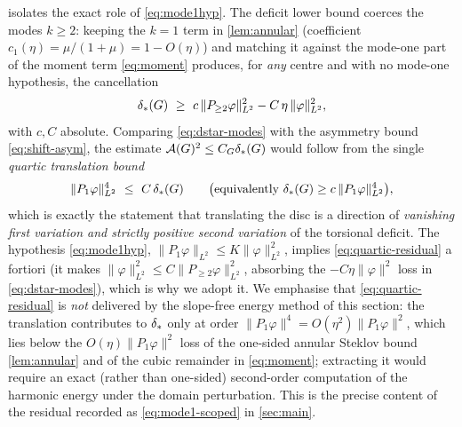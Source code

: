 \begin{remark}
\label{rem:mode1-residual}
 isolates the exact role of \eqref{eq:mode1hyp}. The
deficit lower bound coerces the modes $k\ge2$: keeping the $k=1$ term in
\cref{lem:annular} (coefficient $c_1(\eta)=\mu/(1+\mu)=1-O(\eta)$) and matching
it against the mode-one part of the moment term \eqref{eq:moment} produces, for
\emph{any} centre and with no mode-one hypothesis, the cancellation
\begin{equation}\label{eq:dstar-modes}
   \dstar(G)\ \ge\ c\,\|P_{\ge2}\varphi\|_{L^2}^2-C\,\eta\,\|\varphi\|_{L^2}^2 ,
\end{equation}
with $c,C$ absolute. Comparing \eqref{eq:dstar-modes} with the asymmetry bound
\eqref{eq:shift-asym}, the estimate $\mathcal{A}(G)^2\le C_G\delta_{*}(G)$ would follow from
the single \emph{quartic translation bound}
\begin{equation}\label{eq:quartic-residual}
   \|P_1\varphi\|_{L^2}^4\ \le\ C\,\delta_{*}(G)
   \qquad\bigl(\text{equivalently }\delta_{*}(G)\ge c\,\|P_1\varphi\|_{L^2}^4\bigr),
\end{equation}
which is exactly the statement that translating the disc is a direction of
\emph{vanishing first variation and strictly positive second variation} of the
torsional deficit. The hypothesis \eqref{eq:mode1hyp}, $\|P_1\varphi\|_{L^2}\le
K\|\varphi\|_{L^2}^2$, implies \eqref{eq:quartic-residual} a fortiori (it makes
$\|\varphi\|_{L^2}^2\le C\|P_{\ge2}\varphi\|_{L^2}^2$, absorbing the
$-C\eta\|\varphi\|^2$ loss in \eqref{eq:dstar-modes}), which is why we adopt it.
We emphasise that \eqref{eq:quartic-residual} is \emph{not} delivered by the
slope-free energy method of this section: the translation contributes to
$\delta_{*}$ only at order $\|P_1\varphi\|^4=O(\eta^2)\|P_1\varphi\|^2$, which lies
below the $O(\eta)\|P_1\varphi\|^2$ loss of the one-sided annular Steklov bound
\cref{lem:annular} and of the cubic remainder in \eqref{eq:moment}; extracting
it would require an exact (rather than one-sided) second-order computation of
the harmonic energy under the domain perturbation. This is the precise content
of the residual recorded as \eqref{eq:mode1-scoped} in \cref{sec:main}.
\end{remark}
